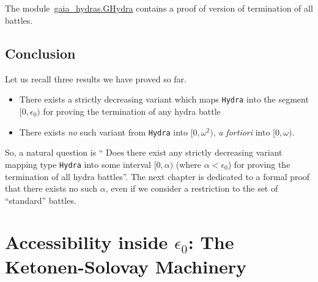     \label{thm:every-battle-terminates}

    

    \paragraph*{\gaiasign}
    The module~\href{../theories/html/gaia_hydras.GHydra.html}{gaia\_hydras.GHydra} contains a proof of \gaiaHydras version of termination of all battles.

    
    \section*{Conclusion}

    Let us recall three results we have proved so far.
    \begin{itemize}
    \item There exists a strictly decreasing variant which maps \texttt{Hydra} into 
    the segment $[0,\epsilon_0)$ for proving the termination of any hydra battle
    \item There exists \emph{no} such variant from \texttt{Hydra} into 
    $[0,\omega^2)$, \emph{a fortiori} into $[0,\omega)$.
    \end{itemize}

    So, a  natural question is `` Does there exist any strictly decreasing variant mapping
    type \texttt{Hydra} into some interval $[0,\alpha)$ (where $\alpha <\epsilon_0$) for proving the termination of all hydra battles''. The next chapter is dedicated to a formal proof that there exists no such $\alpha$, even if we consider a restriction to the set of ``standard'' battles.













\chapter[The Ketonen-Solovay machinery]{Accessibility inside \texorpdfstring{$\epsilon_0$}{Epsilon0}: The Ketonen-Solovay Machinery\label{ks-chapter}}
\label{chap:ketonen}

